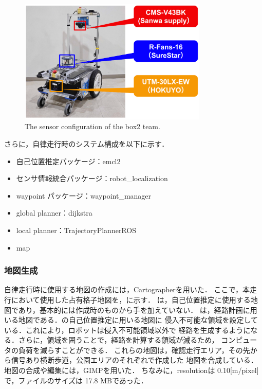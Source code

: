 \documentclass[twocolumn, 9pt]{jsproceedings}
\begin{document}
\begin{figure}[h!]
  \centering
  \includegraphics[width=90mm]{fig/box2_sensor_cut2.pdf}
  \caption{The sensor configuration of the box2 team.}
  \label{fig:box2-sensor}
\end{figure}


さらに，自律走行時のシステム構成を以下に示す．

\begin{itemize}
  \item 自己位置推定パッケージ：emcl2\cite{emcl2}
  \item センサ情報統合パッケージ：robot\_localization\cite{robotlocalization}
  \item waypoint パッケージ：waypoint\_manager\cite{waypoint}
  \item global planner：dijkstra
  \item local planner：TrajectoryPlannerROS
  \item map
\end{itemize}


\subsubsection{地図生成}
自律走行時に使用する地図の作成には，Cartographer\cite{Cartographer}を用いた．
ここで，本走行において使用した占有格子地図を，に示す．
は，自己位置推定に使用する地図であり，基本的には作成時のものから手を加えていない．
は，経路計画に用いる地図である．の自己位置推定に用いる地図に
侵入不可能な領域を設定している．これにより，ロボットは侵入不可能領域以外で
経路を生成するようになる．さらに，領域を囲うことで，経路を計算する領域が減るため，
コンピュータの負荷を減らすことができる．
これらの地図は，確認走行エリア，その先から信号あり横断歩道，公園エリアのそれぞれで作成した
地図を合成している．地図の合成や編集には，GIMP\cite{gimp}を用いた．
ちなみに，resolutionは 0.10[m/pixel]で，ファイルのサイズは 17.8 MBであった．
\end{document}
